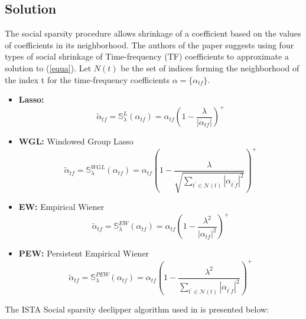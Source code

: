 \documentclass{article}
\numberwithin{dummy}{section}
\begin{document}
\subsection{Solution}
The social sparsity procedure allows shrinkage of a coefficient based on the values of coefficients in its  neighborhood.
The authors of the paper suggests using four types of social shrinkage of Time-frequency (TF) coefficients to approximate a solution to (\ref{equa}). Let $N(t)$ be the set of indices forming the neighborhood of the index t for the time-frequency coefficients $\alpha = \{\alpha_{tf}\}$.
\begin{itemize}
    \item \textbf{Lasso:} $$\tilde{\alpha}_{t f}=\mathbb{S}_{\lambda}^{L}\left(\alpha_{t f}\right)=\alpha_{t f}\left(1-\frac{\lambda}{\left|\alpha_{t f}\right|}\right)^{+}$$
    \item \textbf{WGL:} Windowed Group Lasso $$\tilde{\alpha}_{t f}=\mathbb{S}_{\lambda}^{W G L}\left(\alpha_{t f}\right)=\alpha_{t f}\left(1-\frac{\lambda}{\sqrt{\sum_{t^{\prime} \in \mathcal{N}(t)}\left|\alpha_{t^{\prime} f}\right|^{2}}}\right)^{+}$$
    \item \textbf{EW:} Empirical Wiener $$\tilde{\alpha}_{t f}=\mathbb{S}_{\lambda}^{E W}\left(\alpha_{t f}\right)=\alpha_{t f}\left(1-\frac{\lambda^{2}}{\left|\alpha_{t f}\right|^{2}}\right)^{+}$$
    \item \textbf{PEW:} Persistent Empirical Wiener $$\tilde{\alpha}_{t f}=\mathbb{S}_{\lambda}^{P E W}\left(\alpha_{t f}\right)=\alpha_{t f}\left(1-\frac{\lambda^{2}}{\sum_{t^{\prime} \in \mathcal{N}(t)}\left|\alpha_{t^{\prime} f}\right|^{2}}\right)^{+}$$
\end{itemize}
The ISTA Social sparsity declipper algorithm used in \cite{inproceedings} is presented below:
\end{document}
